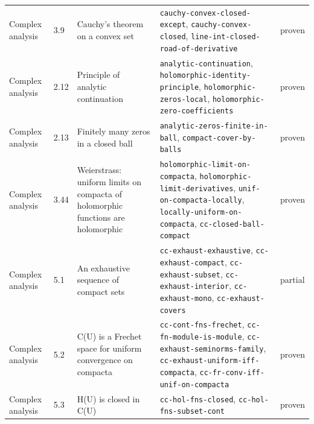 \begin{longtable}{@{}ll>{\raggedright\arraybackslash}p{4.2cm}>{\raggedright\arraybackslash}p{4.2cm}l@{}}
Complex analysis & 3.9 & Cauchy's theorem on a convex set & \texttt{cauchy-\allowbreak{}convex-\allowbreak{}closed-\allowbreak{}except}, \texttt{cauchy-\allowbreak{}convex-\allowbreak{}closed}, \texttt{line-\allowbreak{}int-\allowbreak{}closed-\allowbreak{}road-\allowbreak{}of-\allowbreak{}derivative} & proven \\
Complex analysis & 2.12 & Principle of analytic continuation & \texttt{analytic-\allowbreak{}continuation}, \texttt{holomorphic-\allowbreak{}identity-\allowbreak{}principle}, \texttt{holomorphic-\allowbreak{}zeros-\allowbreak{}local}, \texttt{holomorphic-\allowbreak{}zero-\allowbreak{}coefficients} & proven \\
Complex analysis & 2.13 & Finitely many zeros in a closed ball & \texttt{analytic-\allowbreak{}zeros-\allowbreak{}finite-\allowbreak{}in-\allowbreak{}ball}, \texttt{compact-\allowbreak{}cover-\allowbreak{}by-\allowbreak{}balls} & proven \\
Complex analysis & 3.44 & Weierstrass: uniform limits on compacta of holomorphic functions are holomorphic & \texttt{holomorphic-\allowbreak{}limit-\allowbreak{}on-\allowbreak{}compacta}, \texttt{holomorphic-\allowbreak{}limit-\allowbreak{}derivatives}, \texttt{unif-\allowbreak{}on-\allowbreak{}compacta-\allowbreak{}locally}, \texttt{locally-\allowbreak{}uniform-\allowbreak{}on-\allowbreak{}compacta}, \texttt{cc-\allowbreak{}closed-\allowbreak{}ball-\allowbreak{}compact} & proven \\
Complex analysis & 5.1 & An exhaustive sequence of compact sets & \texttt{cc-\allowbreak{}exhaust-\allowbreak{}exhaustive}, \texttt{cc-\allowbreak{}exhaust-\allowbreak{}compact}, \texttt{cc-\allowbreak{}exhaust-\allowbreak{}subset}, \texttt{cc-\allowbreak{}exhaust-\allowbreak{}interior}, \texttt{cc-\allowbreak{}exhaust-\allowbreak{}mono}, \texttt{cc-\allowbreak{}exhaust-\allowbreak{}covers} & partial \\
Complex analysis & 5.2 & C(U) is a Frechet space for uniform convergence on compacta & \texttt{cc-\allowbreak{}cont-\allowbreak{}fns-\allowbreak{}frechet}, \texttt{cc-\allowbreak{}fn-\allowbreak{}module-\allowbreak{}is-\allowbreak{}module}, \texttt{cc-\allowbreak{}exhaust-\allowbreak{}seminorms-\allowbreak{}family}, \texttt{cc-\allowbreak{}exhaust-\allowbreak{}uniform-\allowbreak{}iff-\allowbreak{}compacta}, \texttt{cc-\allowbreak{}fr-\allowbreak{}conv-\allowbreak{}iff-\allowbreak{}unif-\allowbreak{}on-\allowbreak{}compacta} & proven \\
Complex analysis & 5.3 & H(U) is closed in C(U) & \texttt{cc-\allowbreak{}hol-\allowbreak{}fns-\allowbreak{}closed}, \texttt{cc-\allowbreak{}hol-\allowbreak{}fns-\allowbreak{}subset-\allowbreak{}cont} & proven \\

\end{longtable}
